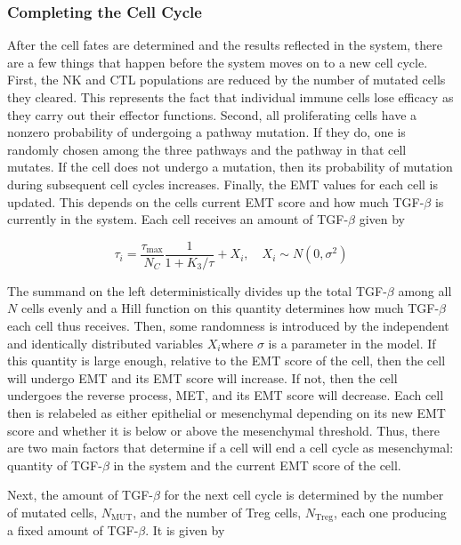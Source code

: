 \documentclass[11pt]{article}
\begin{document}
\subsubsection{Completing the Cell Cycle}
After the cell fates are determined and the results reflected in the system, there are a few things that happen before the system moves on to a new cell cycle.
First, the NK and CTL populations are reduced by the number of mutated cells they cleared.
This represents the fact that individual immune cells lose efficacy as they carry out their effector functions. 
Second, all proliferating cells have a nonzero probability of undergoing a pathway mutation.
If they do, one is randomly chosen among the three pathways and the pathway in that cell mutates.
If the cell does not undergo a mutation, then its probability of mutation during subsequent cell cycles increases. 
Finally, the EMT values for each cell is updated.
This depends on the cells current EMT score and how much TGF-$\beta$ is currently in the system.
Each cell receives an amount of TGF-$\beta$ given by

\begin{equation}\tag{2.5}
\tau_i = \frac{\tau_{\text{max}}}{N_C}\frac{1}{1+K_3/\tau}+ X_i
, \quad X_i \sim N(0,\sigma^2)
\end{equation}

The summand on the left deterministically divides up the total TGF-$\beta$ among all $N$ cells evenly and a Hill function on this quantity determines how much TGF-$\beta$ each cell thus receives.
Then, some randomness is introduced by the independent and identically distributed variables $X_i$where $\sigma$ is a parameter in the model.
If this quantity is large enough, relative to the EMT score of the cell, then the cell will undergo EMT and its EMT score will increase.
If not, then the cell undergoes the reverse process, MET, and its EMT score will decrease.
Each cell then is relabeled as either epithelial or mesenchymal depending on its new EMT score and whether it is below or above the mesenchymal threshold.
Thus, there are two main factors that determine if a cell will end a cell cycle as mesenchymal: quantity of TGF-$\beta$ in the system and the current EMT score of the cell.

Next, the amount of TGF-$\beta$ for the next cell cycle is determined by the number of mutated cells, $N_{\text{MUT}}$, and the number of Treg cells, $N_{\text{Treg}}$, each one producing a fixed amount of TGF-$\beta$. It is given by
\end{document}
